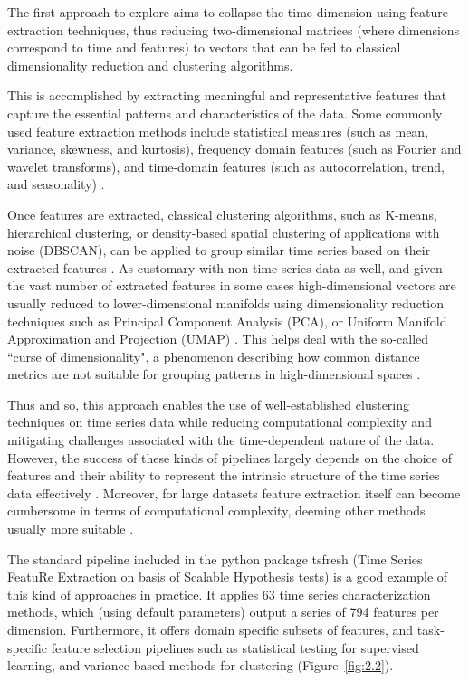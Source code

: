 The first approach to explore aims to collapse the time dimension using feature extraction techniques, thus reducing two-dimensional matrices (where dimensions correspond to time and features) to vectors that can be fed to classical dimensionality reduction and clustering algorithms.

This is accomplished by extracting meaningful and representative features that capture the essential patterns and characteristics of the data. Some commonly used feature extraction methods include statistical measures (such as mean, variance, skewness, and kurtosis), frequency domain features (such as Fourier and wavelet transforms), and time-domain features (such as autocorrelation, trend, and seasonality) \cite{Fulcher2017Feature-basedAnalysis}. 

Once features are extracted, classical clustering algorithms, such as K-means, hierarchical clustering, or density-based spatial clustering of applications with noise (DBSCAN), can be applied to group similar time series based on their extracted features \cite{ChristopherMBishop2006PatternLearning}. As customary with non-time-series data as well, and given the vast number of extracted features in some cases \cite{Christ2018TimePackage} high-dimensional vectors are usually reduced to lower-dimensional manifolds using dimensionality reduction techniques such as Principal Component Analysis (PCA), or Uniform Manifold Approximation and Projection (UMAP) \cite{Xia2021RevisitingStudy, McInnes2018UMAP:Reduction}. This helps deal with the so-called ``curse of dimensionality", a phenomenon describing how common distance metrics are not suitable for grouping patterns in high-dimensional spaces \cite{Murphy2022ProbabilisticIntroduction}.

Thus and so, this approach enables the use of well-established clustering techniques on time series data while reducing computational complexity and mitigating challenges associated with the time-dependent nature of the data. However, the success of these kinds of pipelines largely depends on the choice of features and their ability to represent the intrinsic structure of the time series data effectively \cite{Enes2023AJobs, Petelin2023TowardsPrediction}. Moreover, for large datasets feature extraction itself can become cumbersome in terms of computational complexity, deeming other methods usually more suitable \cite{Petelin2023TowardsPrediction}.

The standard pipeline included in the python package tsfresh (Time Series FeatuRe Extraction on basis of Scalable Hypothesis tests) is a good example of this kind of approaches in practice. It applies 63 time series characterization methods, which (using default parameters) output a series of 794 features per dimension. Furthermore, it offers domain specific subsets of features, and task-specific feature selection pipelines such as statistical testing for supervised learning, and variance-based methods for clustering \cite{Christ2018TimePackage} (Figure~\ref{fig:2.2}).

